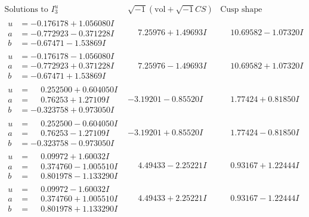 \documentclass[1p]{elsarticle_modified}
\theoremstyle{definition}
\newcommand{\I}{\sqrt{-1}}
\begin{document}
$$\begin{array}{c|c|c}  
\text{Solutions to }I^u_{3}& \I (\text{vol} + \sqrt{-1}CS) & \text{Cusp shape}\\
 \hline 
\begin{aligned}
u &= -0.176178 + 1.056080 I \\
a &= -0.772923 - 0.371228 I \\
b &= -0.67471 - 1.53869 I\end{aligned}
 & \phantom{-}7.25976 + 1.49693 I & \phantom{-}10.69582 - 1.07320 I \\ \hline\begin{aligned}
u &= -0.176178 - 1.056080 I \\
a &= -0.772923 + 0.371228 I \\
b &= -0.67471 + 1.53869 I\end{aligned}
 & \phantom{-}7.25976 - 1.49693 I & \phantom{-}10.69582 + 1.07320 I \\ \hline\begin{aligned}
u &= \phantom{-}0.252500 + 0.604050 I \\
a &= \phantom{-}0.76253 + 1.27109 I \\
b &= -0.323758 + 0.973050 I\end{aligned}
 & -3.19201 - 0.85520 I & \phantom{-}1.77424 + 0.81850 I \\ \hline\begin{aligned}
u &= \phantom{-}0.252500 - 0.604050 I \\
a &= \phantom{-}0.76253 - 1.27109 I \\
b &= -0.323758 - 0.973050 I\end{aligned}
 & -3.19201 + 0.85520 I & \phantom{-}1.77424 - 0.81850 I \\ \hline\begin{aligned}
u &= \phantom{-}0.09972 + 1.60032 I \\
a &= \phantom{-}0.374760 - 1.005510 I \\
b &= \phantom{-}0.801978 - 1.133290 I\end{aligned}
 & \phantom{-}4.49433 - 2.25221 I & \phantom{-}0.93167 + 1.22444 I \\ \hline\begin{aligned}
u &= \phantom{-}0.09972 - 1.60032 I \\
a &= \phantom{-}0.374760 + 1.005510 I \\
b &= \phantom{-}0.801978 + 1.133290 I\end{aligned}
 & \phantom{-}4.49433 + 2.25221 I & \phantom{-}0.93167 - 1.22444 I \\ \hline\begin{aligned}

\end{aligned}
\end{array}$$
\end{document}
